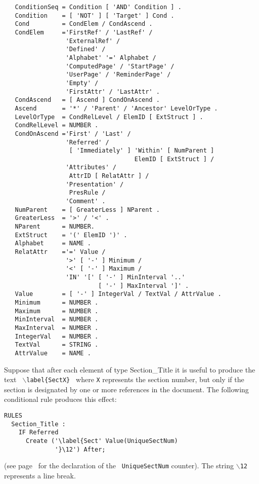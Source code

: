 \begin{verbatim}
   ConditionSeq = Condition [ 'AND' Condition ] .
   Condition    = [ 'NOT' ] [ 'Target' ] Cond .
   Cond         = CondElem / CondAscend .
   CondElem     ='FirstRef' / 'LastRef' /
                 'ExternalRef' /
                 'Defined' /
                 'Alphabet' '=' Alphabet /
                 'ComputedPage' / 'StartPage' / 
                 'UserPage' / 'ReminderPage' /
                 'Empty' /
                 'FirstAttr' / 'LastAttr' .
   CondAscend   = [ Ascend ] CondOnAscend .
   Ascend       = '*' / 'Parent' / 'Ancestor' LevelOrType .
   LevelOrType  = CondRelLevel / ElemID [ ExtStruct ] .
   CondRelLevel = NUMBER .
   CondOnAscend ='First' / 'Last' /
                 'Referred' / 
                  [ 'Immediately' ] 'Within' [ NumParent ]
                                    ElemID [ ExtStruct ] /
                 'Attributes' /
                  AttrID [ RelatAttr ] /
                 'Presentation' /
                  PresRule /
                 'Comment' .		  
   NumParent    = [ GreaterLess ] NParent .
   GreaterLess  = '>' / '<' .
   NParent      = NUMBER.
   ExtStruct    = '(' ElemID ')' .
   Alphabet     = NAME .
   RelatAttr    ='=' Value /
                 '>' [ '-' ] Minimum /
                 '<' [ '-' ] Maximum /
                 'IN' '[' [ '-' ] MinInterval '..'
                          [ '-' ] MaxInterval ']' .
   Value        = [ '-' ] IntegerVal / TextVal / AttrValue .
   Minimum      = NUMBER .
   Maximum      = NUMBER .
   MinInterval  = NUMBER .
   MaxInterval  = NUMBER .
   IntegerVal   = NUMBER .
   TextVal      = STRING .
   AttrValue    = NAME .
\end{verbatim}

\begin{example}
Suppose that after each element of type Section\_Title it is useful to produce the text {\tt
$\backslash$label\{SectX\} } where {\tt X} represents the section
number, but only if the section is designated by one or more
references in the document.  The following conditional rule produces
this effect:

\begin{verbatim}
RULES
  Section_Title :
    IF Referred
      Create ('\label{Sect' Value(UniqueSectNum)
              '}\12') After;
\end{verbatim}
(see page~\pageref{numunique} for the declaration of the {\tt
UniqueSectNum} counter).  The string {\tt $\backslash$12} represents a
line break.
\end{example}

